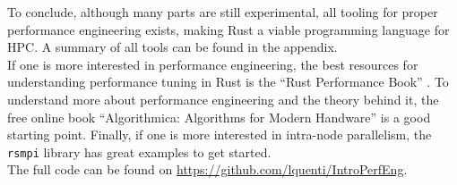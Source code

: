 To conclude, although many parts are still experimental, all tooling for proper performance engineering exists, making Rust a viable programming language for \ac{HPC}. A summary of all tools can be found in the appendix.\\

If one is more interested in performance engineering, the best resources for understanding performance tuning in Rust is the ``Rust Performance Book'' \cite{rperfbook}. To understand more about performance engineering and the theory behind it, the free online book ``Algorithmica: Algorithms for Modern Handware'' \cite{algomodern} is a good starting point. Finally, if one is more interested in intra-node parallelism, the \texttt{rsmpi} library \cite{rsmpi} has great examples to get started.\\

The full code can be found on \url{https://github.com/lquenti/IntroPerfEng}.
